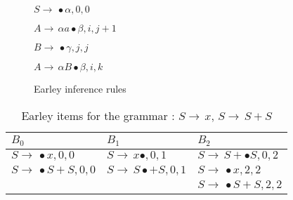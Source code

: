 \begin{isabellebody}
\begin{isamarkuptext}
\begin{figure}[htpb]
    \begin{mathpar}
      \inferrule [Init]
      {\\}
      {$S \rightarrow \, \bullet\alpha, 0, 0$}
  
      {$A \rightarrow \, \alpha a \bullet \beta, i, j+1$}
  
      {$B \rightarrow \, \bullet \gamma, j, j$}
  
      {$A \rightarrow \, \alpha B \bullet \beta, i, k$}
    \end{mathpar}
    \caption[Earley inference rules]{Earley inference rules}\label{fig:earley-inference-rules}
    \label{fig:inference_rules}
  \end{figure}%
\end{isamarkuptext}\isamarkuptrue%
%
\begin{isamarkuptext}%
\begin{table}[htpb] 
    \caption[Earley items running example]{Earley items for the grammar \isa{{\isasymG}}: $S \rightarrow \, x$, $S \rightarrow \, S + S$}\label{tab:earley-items}
    \centering
    \begin{tabular}{| l | l | l |}
        $B_0$                                   & $B_1$                                    & $B_2$                                \\
      \midrule
        $S \rightarrow \, \bullet x, 0, 0$      & $S \rightarrow \, x \bullet, 0, 1$     & $S \rightarrow \, S + \bullet S, 0, 2$ \\
        $S \rightarrow \, \bullet S + S, 0 , 0$ & $S \rightarrow \, S \bullet + S, 0, 1$ & $S \rightarrow \, \bullet x, 2, 2$     \\
                                                &                                        & $S \rightarrow \, \bullet S + S, 2, 2$ \\

      \midrule


\end{tabular}
\end{table}
\end{isamarkuptext}
\end{isabellebody}
